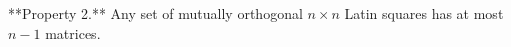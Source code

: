 **Property 2.** Any set of mutually orthogonal $n \times n$ Latin squares has at most $n-1$ matrices.
